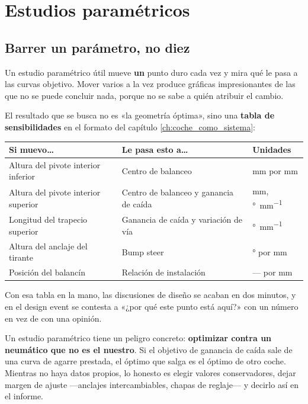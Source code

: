 \section{Estudios paramétricos}
\label{sec:puntos_duros:03}

\subsection{Barrer un parámetro, no diez}

Un estudio paramétrico útil mueve \textbf{un} punto duro cada vez y mira qué le
pasa a las curvas objetivo. Mover varios a la vez produce gráficas
impresionantes de las que no se puede concluir nada, porque no se sabe a quién
atribuir el cambio.

El resultado que se busca no es «la geometría óptima», sino una \textbf{tabla de
sensibilidades} en el formato del capítulo \ref{ch:coche_como_sistema}:

\begin{center}
\begin{tabularx}{\textwidth}{@{}lXl@{}}
\toprule
\textbf{Si muevo\ldots} & \textbf{Le pasa esto a\ldots} & \textbf{Unidades} \\
\midrule
Altura del pivote interior inferior & Centro de balanceo & \si{\milli\meter} por \si{\milli\meter} \\
Altura del pivote interior superior & Centro de balanceo y ganancia de caída & \si{\milli\meter}, \si{\degree\per\milli\meter} \\
Longitud del trapecio superior & Ganancia de caída y variación de vía & \si{\degree\per\milli\meter} \\
Altura del anclaje del tirante & Bump steer & \si{\degree} por \si{\milli\meter} \\
Posición del balancín & Relación de instalación & --- por \si{\milli\meter} \\
\bottomrule
\end{tabularx}
\end{center}

Con esa tabla en la mano, las discusiones de diseño se acaban en dos minutos, y
en el design event se contesta a «¿por qué este punto está aquí?» con un número
en vez de con una opinión.

\begin{ojo}
Un estudio paramétrico tiene un peligro concreto: \textbf{optimizar contra un
neumático que no es el nuestro}. Si el objetivo de ganancia de caída sale de
una curva de agarre prestada, el óptimo que salga es el óptimo de otro coche.
Mientras no haya datos propios, lo honesto es elegir valores conservadores,
dejar margen de ajuste ---anclajes intercambiables, chapas de reglaje--- y
decirlo así en el informe.
\end{ojo}

